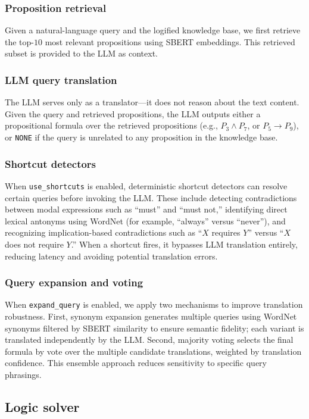 \documentclass{article} %
\begin{document}
\subsubsection{Proposition retrieval}
Given a natural-language query and the logified knowledge base, we first retrieve the top-$10$ most relevant propositions using SBERT embeddings. This retrieved subset is provided to the LLM as context. 

\subsubsection{LLM query translation}
The LLM serves only as a translator---it does not reason about the text content. Given the query and retrieved propositions, the LLM outputs either a propositional formula over the retrieved propositions (e.g., $P_3 \land P_7$, or $P_5 \rightarrow P_9$), or \texttt{NONE} if the query is unrelated to any proposition in the knowledge base.

\subsubsection{Shortcut detectors}
When \texttt{use\_shortcuts} is enabled, deterministic shortcut detectors can resolve certain queries before invoking the LLM. These include detecting contradictions between modal expressions such as ``must'' and ``must not,'' identifying direct lexical antonyms using WordNet (for example, ``always'' versus ``never''), and recognizing implication-based contradictions such as ``$X$ requires $Y$'' versus ``$X$ does not require $Y$.'' When a shortcut fires, it bypasses LLM translation entirely, reducing latency and avoiding potential translation errors.

\subsubsection{Query expansion and voting}
When \texttt{expand\_query} is enabled, we apply two mechanisms to improve translation robustness. First, synonym expansion generates multiple queries  using WordNet synonyms filtered by SBERT similarity to ensure semantic fidelity; each variant is translated independently by the LLM. Second, majority voting selects the final formula by vote over the multiple candidate translations, weighted by translation confidence. This ensemble approach reduces sensitivity to specific query phrasings.

\subsection{Logic solver}
\end{document}
